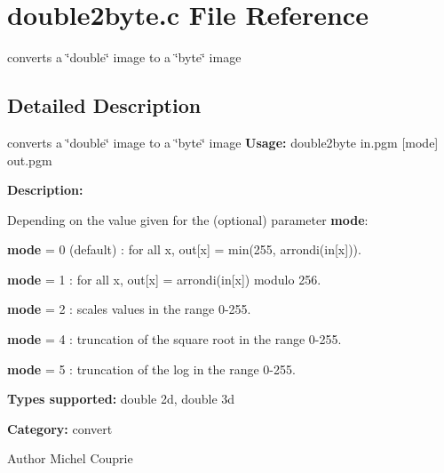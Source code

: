 \section{double2byte.c File Reference}
\label{double2byte_8c}


converts a \char`\"{}double\char`\"{} image to a \char`\"{}byte\char`\"{} image  




\subsection{Detailed Description}
converts a \char`\"{}double\char`\"{} image to a \char`\"{}byte\char`\"{} image {\bfseries Usage:} double2byte in.pgm [mode] out.pgm

{\bfseries Description:}

Depending on the value given for the (optional) parameter {\bfseries mode}: \begin{DoxyItemize}
\item {\bfseries mode} = 0 (default) : for all x, out[x] = min(255, arrondi(in[x])). \item {\bfseries mode} = 1 : for all x, out[x] = arrondi(in[x]) modulo 256. \item {\bfseries mode} = 2 : scales values in the range 0-\/255. \item {\bfseries mode} = 4 : truncation of the square root in the range 0-\/255. \item {\bfseries mode} = 5 : truncation of the log in the range 0-\/255.\end{DoxyItemize}
{\bfseries Types supported:} double 2d, double 3d

{\bfseries Category:} convert

\begin{DoxyAuthor}{Author}
Michel Couprie 
\end{DoxyAuthor}
